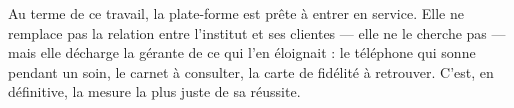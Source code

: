 \vspace{0.5cm}

Au terme de ce travail, la plate-forme est prête à entrer en service. Elle ne
remplace pas la relation entre l'institut et ses clientes --- elle ne le
cherche pas --- mais elle décharge la gérante de ce qui l'en éloignait : le
téléphone qui sonne pendant un soin, le carnet à consulter, la carte de
fidélité à retrouver. C'est, en définitive, la mesure la plus juste de sa
réussite.
